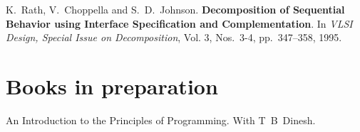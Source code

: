 \documentclass[11pt,margin,line]{res}
\begin{document}
\begin{resume}
K.~Rath, V.~Choppella and S.~D.~Johnson.  {\bf Decomposition
of Sequential Behavior using Interface Specification and
Complementation}.  In {\em {VLSI Design, Special Issue on
Decomposition}}, Vol. 3, Nos.~3-4, pp.~347--358, 1995.



\vspace{2em}








\vspace{2em}

\section{\sc Books in preparation}

An Introduction to the Principles of Programming.  With
T~B~Dinesh.

\vspace{2em}


\end{resume}
\end{document}
